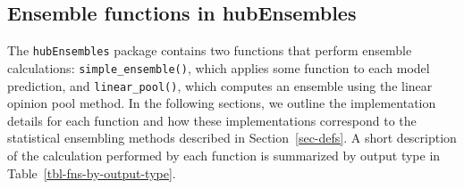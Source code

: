 \documentclass[
]{article}
\begin{document}
\subsection{Ensemble functions in hubEnsembles}\label{sec-ens-fns}

The \texttt{hubEnsembles} package contains two functions that perform
ensemble calculations: \texttt{simple\_ensemble()}, which applies some
function to each model prediction, and \texttt{linear\_pool()}, which
computes an ensemble using the linear opinion pool method. In the
following sections, we outline the implementation details for each
function and how these implementations correspond to the statistical
ensembling methods described in Section~\ref{sec-defs}. A short
description of the calculation performed by each function is summarized
by output type in Table~\ref{tbl-fns-by-output-type}.
\end{document}
